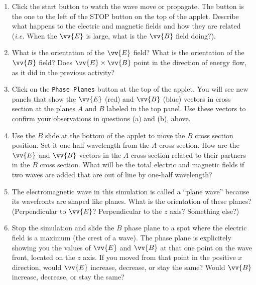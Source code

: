 \begin{enumerate}[labparts]

\item Click the start button to watch the wave move or propagate. The button is the one to the left of the STOP button on the top of the applet.
Describe what happens to the electric and magnetic fields and how they are related
({\it i.e.} When the $\vv {E}$ is large, what is the $\vv {B}$ field doing?).
\answerspace{3.0cm}

\item What is the orientation of the $\vv {E}$ field?
What is the orientation of the $\vv {B}$ field?
Does $\vv {E} \times \vv {B}$ point in the direction of energy flow, as it did in the previous activity?
\answerspace{2.0cm}


\item Click on the \texttt{Phase Planes} button at the top of the applet.
You will see new panels that show the $\vv {E}$ (red) and $\vv {B}$ (blue) vectors in cross section at the
planes $A$ and $B$ labeled in the top panel.
Use these vectors to confirm your observations in questions (a) and (b), above.
\answerspace{3.0cm}

\item Use the $B$ slide at the bottom of the applet to move the $B$ cross 
section position.
Set it one-half wavelength from the $A$ cross section.
How are the $\vv {E}$ and $\vv {B}$ vectors in the $A$ cross section related to their partners 
in the $B$ cross section.
What will be the total electric and magnetic fields if two waves are added that are out of line
by one-half wavelength?
\answerspace{1.5cm}

\item The electromagnetic wave in this simulation is called a ``plane wave'' because its wavefronts are shaped like planes.  What is the orientation of these planes?  (Perpendicular to $\vv {E}$?  Perpendicular to the $z$ axis? Something else?) 
\answerspace{1.5cm}

\item Stop the simulation and slide the $B$ phase plane to a spot where the electric field is a maximum (the crest of a wave).  The phase plane is explicitely showing you the values of $\vv {E}$ and $\vv {B}$ at that one point on the wave front, located on the $z$ axis.  If you moved from that point in the positive $x$ direction, would $\vv {E}$ increase, decrease, or stay the same?  Would $\vv {B}$ increase, decrease, or stay the same? 
\answerspace{2.0cm}

\end{enumerate}

